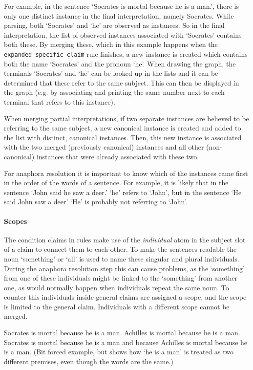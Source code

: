 \documentclass{IOS-Book-Article}
\begin{document}
For example, in the sentence `Socrates is mortal because he is a man.', there is only one distinct instance in the final interpretation, namely Socrates. While parsing, both `Socrates' and `he' are observed as instances. So in the final interpretation, the list of observed instances associated with `Socrates' contains both these. By merging these, which in this example happens when the \texttt{expanded-specific-claim} rule finishes, a new instance is created which contains both the name `Socrates' and the pronoun `he'. When drawing the graph, the terminals `Socrates' and `he' can be looked up in the lists and it can be determined that these refer to the same subject. This can then be displayed in the graph (e.g. by associating and printing the same number next to each terminal that refers to this instance).

When merging partial interpretations, if two separate instances are believed to be referring to the same subject, a new canonical instance is created and added to the list with distinct, canonical instances. Then, this new instance is associated with the two merged (previously canonical) instances and all other (non-canonical) instances that were already associated with these two.

For anaphora resolution it is important to know which of the instances came first in the order of the words of a sentence. For example, it is likely that in the sentence `John said he saw a deer.' `he' refers to `John', but in the sentence `He said John saw a deer' `He' is probably not referring to `John'.

\paragraph{Scopes}
The condition claims in rules make use of the \emph{individual} atom in the subject slot of a claim to connect them to each other. To make the sentences readable the noun `something' or `all' is used to name these singular and plural individuals. During the anaphora resolution step this can cause problems, as the `something' from one of these individuals might be linked to the `something' from another one, as would normally happen when individuals repeat the same noun. To counter this individuals inside general claims are assigned a scope, and the scope is limited to the general claim. Individuals with a different scope cannot be merged.

\begin{exe}
	\ex\label{gramscopes} Socrates is mortal because he is a man. Achilles is mortal because he is a man.
	\ex Socrates is mortal because he is a man and because Achilles is mortal because he is a man. (Bit forced example, but shows how `he is a man' is treated as two different premises, even though the words are the same.)
\end{exe}
\end{document}
